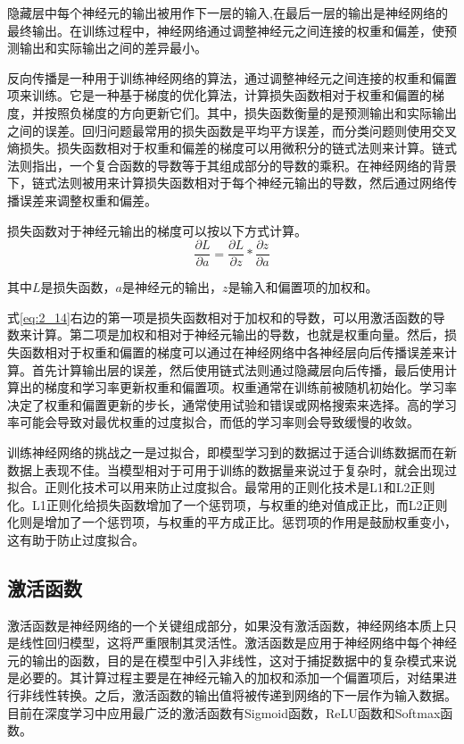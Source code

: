 隐藏层中每个神经元的输出被用作下一层的输入,在最后一层的输出是神经网络的最终输出。在训练过程中，神经网络通过调整神经元之间连接的权重和偏差，使预测输出和实际输出之间的差异最小。

反向传播是一种用于训练神经网络的算法，通过调整神经元之间连接的权重和偏置项来训练。它是一种基于梯度的优化算法，计算损失函数相对于权重和偏置的梯度，并按照负梯度的方向更新它们。其中，损失函数衡量的是预测输出和实际输出之间的误差。回归问题最常用的损失函数是平均平方误差，而分类问题则使用交叉熵损失。损失函数相对于权重和偏差的梯度可以用微积分的链式法则来计算。链式法则指出，一个复合函数的导数等于其组成部分的导数的乘积。在神经网络的背景下，链式法则被用来计算损失函数相对于每个神经元输出的导数，然后通过网络传播误差来调整权重和偏差。

损失函数对于神经元输出的梯度可以按以下方式计算。
\begin{equation}
\label{eq:2_14}
\frac{\partial L}{\partial a} = \frac{\partial L}{\partial z} * \frac{\partial z}{\partial a}
\end{equation}


其中$L$是损失函数，$a$是神经元的输出，$z$是输入和偏置项的加权和。

式\ref{eq:2_14}右边的第一项是损失函数相对于加权和的导数，可以用激活函数的导数来计算。第二项是加权和相对于神经元输出的导数，也就是权重向量。然后，损失函数相对于权重和偏置的梯度可以通过在神经网络中各神经层向后传播误差来计算。首先计算输出层的误差，然后使用链式法则通过隐藏层向后传播，最后使用计算出的梯度和学习率更新权重和偏置项。权重通常在训练前被随机初始化。学习率决定了权重和偏置更新的步长，通常使用试验和错误或网格搜索来选择。高的学习率可能会导致对最优权重的过度拟合，而低的学习率则会导致缓慢的收敛。

训练神经网络的挑战之一是过拟合，即模型学习到的数据过于适合训练数据而在新数据上表现不佳。当模型相对于可用于训练的数据量来说过于复杂时，就会出现过拟合。正则化技术可以用来防止过度拟合。最常用的正则化技术是L1和L2正则化。L1正则化给损失函数增加了一个惩罚项，与权重的绝对值成正比，而L2正则化则是增加了一个惩罚项，与权重的平方成正比。惩罚项的作用是鼓励权重变小，这有助于防止过度拟合。

\subsection{激活函数}

激活函数是神经网络的一个关键组成部分，如果没有激活函数，神经网络本质上只是线性回归模型，这将严重限制其灵活性。激活函数是应用于神经网络中每个神经元的输出的函数，目的是在模型中引入非线性，这对于捕捉数据中的复杂模式来说是必要的。其计算过程主要是在神经元输入的加权和添加一个偏置项后，对结果进行非线性转换。之后，激活函数的输出值将被传递到网络的下一层作为输入数据。目前在深度学习中应用最广泛的激活函数有Sigmoid函数，ReLU函数和Softmax函数。

